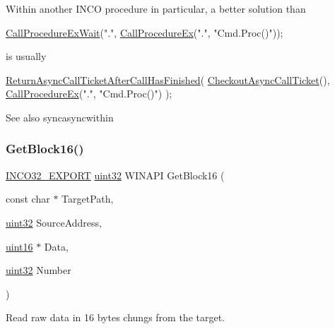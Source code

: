 Within another I\+N\+CO procedure in particular, a better solution than 
\begin{DoxyCode}
\hyperlink{group__commonfunctions_ga1b55ca711acd0dcc672e5fefe5cff27e}{CallProcedureExWait}(\textcolor{stringliteral}{"."}, \hyperlink{group__commonfunctions_ga6b9c6b3f22614e8a2072f8c490402131}{CallProcedureEx}(\textcolor{stringliteral}{"."}, \textcolor{stringliteral}{"Cmd.Proc()"}));
\end{DoxyCode}
 is usually 
\begin{DoxyCode}
\hyperlink{inco__32_8h_a6777f042962e0af6ecd414a5bf409343}{ReturnAsyncCallTicketAfterCallHasFinished}(
    \hyperlink{inco__32_8h_a4d9e4e45113399ec8110d78e27e16faf}{CheckoutAsyncCallTicket}(),
    \hyperlink{group__commonfunctions_ga6b9c6b3f22614e8a2072f8c490402131}{CallProcedureEx}(\textcolor{stringliteral}{"."}, \textcolor{stringliteral}{"Cmd.Proc()"})
);
\end{DoxyCode}


See also syncasyncwithin \mbox{\label{group__commonfunctions_gae507b3a868c5004a2142190a48958d79}} 
\subsubsection{\texorpdfstring{Get\+Block16()}{GetBlock16()}}
{\footnotesize\ttfamily \hyperlink{inco__32_8h_a09505cad5bbb66fc36750a4fbca0444b}{I\+N\+C\+O32\+\_\+\+E\+X\+P\+O\+RT} \hyperlink{indeltypes_8h_a4b435a49c74bb91f284f075e63416cb6}{uint32} W\+I\+N\+A\+PI Get\+Block16 (\begin{DoxyParamCaption}\item[{const char $\ast$}]{Target\+Path,  }\item[{\hyperlink{indeltypes_8h_a4b435a49c74bb91f284f075e63416cb6}{uint32}}]{Source\+Address,  }\item[{\hyperlink{indeltypes_8h_a05f6b0ae8f6a6e135b0e290c25fe0e4e}{uint16} $\ast$}]{Data,  }\item[{\hyperlink{indeltypes_8h_a4b435a49c74bb91f284f075e63416cb6}{uint32}}]{Number }\end{DoxyParamCaption})}



Read raw data in 16 bytes chungs from the target. 


